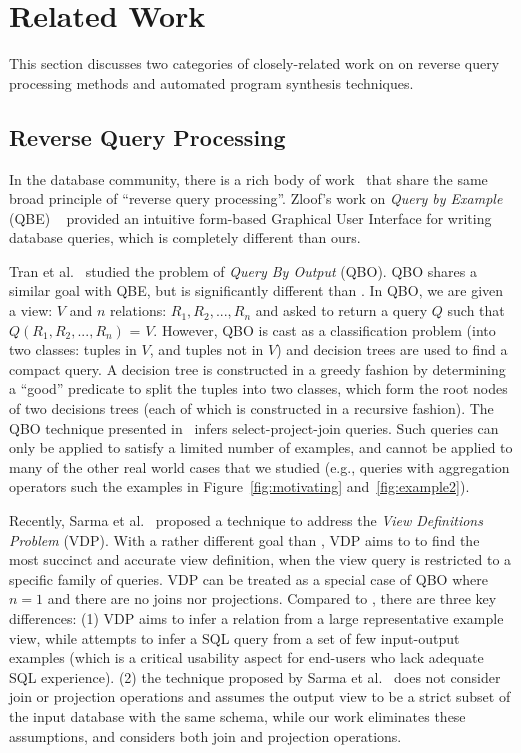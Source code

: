 
\section{Related Work}
\label{sec:related}

This section discusses two categories
of closely-related work on on reverse query processing methods
and automated program synthesis techniques.


\subsection{Reverse Query Processing}

In the database community, there is a rich body of
work~\cite{Zloof:1975, Tran:2009, DasSarma:2010} that share the same broad principle
of ``reverse query processing''. Zloof's work on \textit{Query by Example} (QBE)
~\cite{Zloof:1975} provided an intuitive form-based Graphical User Interface for
writing database queries, which is completely different than ours.

 Tran et al.~\cite{Tran:2009} studied the
problem of \textit{Query By Output} (QBO). QBO shares a similar
goal with QBE, but is significantly different than \ourtool.
In QBO, we are given a view: $V$ and $n$ relations: $R_1, R_2, ..., R_n$ and asked to
return a query $Q$ such that $Q(R_1, R_2, ..., R_n)$ = $V$. 
However, QBO is cast as
a classification problem (into two classes: tuples in $V$, and tuples not in $V$)
and decision trees are used to find a compact query. A decision tree is constructed
in a greedy fashion by determining a ``good'' predicate to split the tuples into two
classes, which form the root nodes of two decisions trees (each of which is
constructed in a recursive fashion).  The QBO technique presented in~\cite{Tran:2009}
infers select-project-join queries. Such queries can only be applied to
satisfy a limited number of examples, and cannot be applied to many of the other
real world cases that we studied (e.g., queries with aggregation operators
such the examples in Figure~\ref{fig:motivating} and~\ref{fig:example2}).

Recently, Sarma et al.~\cite{DasSarma:2010} proposed a technique
to address the \textit{View Definitions Problem} (VDP).
With a rather different goal than \ourtool,
VDP aims to to find the most succinct and accurate view definition, when
the view query is restricted to a specific family of queries.
VDP can be treated as a special
case of QBO where $n = 1$ and there are no joins nor projections.
Compared to \ourtool, there are three key differences:
(1) VDP aims to infer a relation from a large representative
example view, while \ourtool attempts to infer a SQL query from a
set of few input-output examples 
(which is a critical usability aspect for end-users who lack adequate
SQL experience). (2) the technique proposed by Sarma et al.~\cite{DasSarma:2010} does
not consider join or projection
operations and assumes the output view to be a strict subset of the input
database with the same schema, while our work eliminates these
assumptions, and considers both join and projection operations.


